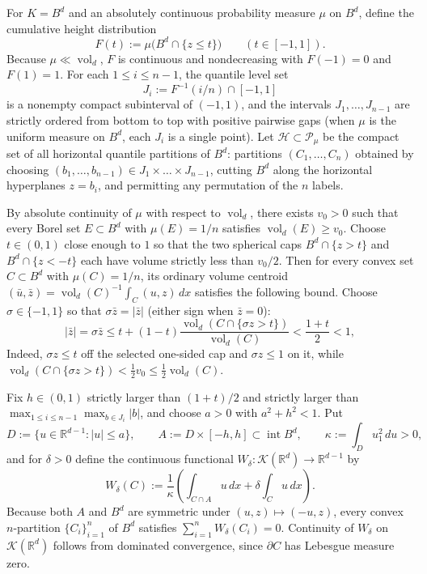 \documentclass[11pt,a4paper]{amsart}
\numberwithin{equation}{section}
\theoremstyle{definition}
\newcommand{\R}{\mathbb{R}}
\newcommand{\Kcal}{\mathcal{K}}
\newcommand{\Pcal}{\mathcal{P}}
\newcommand{\Hcal}{\mathcal{H}}
\newcommand{\inte}{\operatorname{int}}
\newcommand{\vol}{\operatorname{vol}}
\begin{document}
For $K = B^d$ and an absolutely continuous probability measure $\mu$ on $B^d$, define the cumulative height distribution
\[
F(t) := \mu\bigl(B^d \cap \{z \le t\}\bigr) \qquad (t \in [-1,1]).
\]
Because $\mu \ll \vol_d$, $F$ is continuous and nondecreasing with $F(-1) = 0$ and $F(1) = 1$. For each $1 \le i \le n-1$, the quantile level set
\[
J_i := F^{-1}(i/n) \cap [-1, 1]
\]
is a nonempty compact subinterval of $(-1, 1)$, and the intervals $J_1, \dots, J_{n-1}$ are strictly ordered from bottom to top with positive pairwise gaps (when $\mu$ is the uniform measure on $B^d$, each $J_i$ is a single point). Let $\Hcal \subset \Pcal_\mu$ be the compact set of all horizontal quantile partitions of $B^d$: partitions $(C_1, \dots, C_n)$ obtained by choosing $(b_1, \dots, b_{n-1}) \in J_1 \times \dots \times J_{n-1}$, cutting $B^d$ along the horizontal hyperplanes $z = b_i$, and permitting any permutation of the $n$ labels.

By absolute continuity of $\mu$ with respect to $\vol_d$, there exists $v_0 > 0$ such that every Borel set $E \subset B^d$ with $\mu(E) = 1/n$ satisfies $\vol_d(E) \ge v_0$. Choose $t \in (0,1)$ close enough to $1$ so that the two spherical caps $B^d \cap \{z > t\}$ and $B^d \cap \{z < -t\}$ each have volume strictly less than $v_0 / 2$. Then for every convex set $C \subset B^d$ with $\mu(C) = 1/n$, its ordinary volume centroid $(\bar u, \bar z) = \vol_d(C)^{-1} \int_C (u,z)\,dx$ satisfies the following bound. Choose $\sigma \in \{-1,1\}$ so that $\sigma \bar z = |\bar z|$ (either sign when $\bar z = 0$):
\begin{equation}
\label{eq:z-centroid-bound}
|\bar z| = \sigma \bar z \le t + (1-t)\frac{\vol_d(C \cap \{\sigma z > t\})}{\vol_d(C)} < \frac{1+t}{2} < 1,
\end{equation}
Indeed, $\sigma z \le t$ off the selected one-sided cap and $\sigma z \le 1$ on it, while $\vol_d(C \cap \{\sigma z > t\}) < \frac{1}{2}v_0 \le \frac{1}{2}\vol_d(C)$.

Fix $h \in (0,1)$ strictly larger than $(1+t)/2$ and strictly larger than $\max_{1 \le i \le n-1} \max_{b \in J_i} |b|$, and choose $a > 0$ with $a^2 + h^2 < 1$. Put
\begin{equation}
\label{eq:def-W-delta}
D := \{u \in \R^{d-1} : |u| \le a\}, \qquad A := D \times [-h, h] \subset \inte B^d, \qquad \kappa := \int_D u_1^2 \, du > 0,
\end{equation}
and for $\delta > 0$ define the continuous functional $W_\delta : \Kcal(\R^d) \to \R^{d-1}$ by
\begin{equation}
\label{eq:W-delta-formula}
W_\delta(C) := \frac{1}{\kappa} \left(\int_{C \cap A} u \, dx + \delta \int_C u \, dx\right).
\end{equation}
Because both $A$ and $B^d$ are symmetric under $(u,z) \mapsto (-u,z)$, every convex $n$-partition $\{C_i\}_{i=1}^n$ of $B^d$ satisfies $\sum_{i=1}^n W_\delta(C_i) = 0$. Continuity of $W_\delta$ on $\Kcal(\R^d)$ follows from dominated convergence, since $\partial C$ has Lebesgue measure zero.
\end{document}
